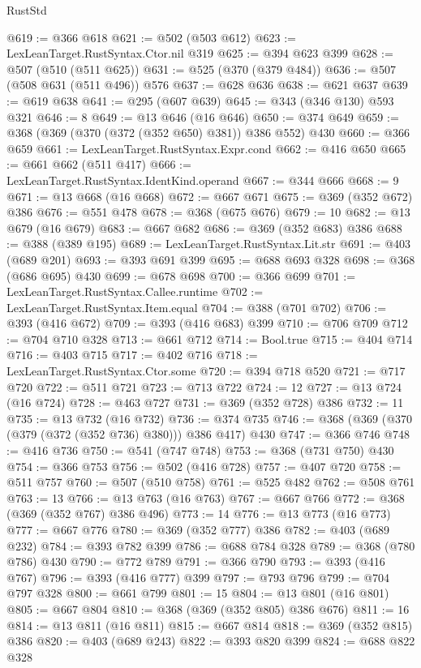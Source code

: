 \begin{lexlean}{RustStd}
\begin{coremodule}
@619 := @366 @618
@621 := @502 (@503 @612)
@623 := LexLeanTarget.RustSyntax.Ctor.nil @319
@625 := @394 @623 @399
@628 := @507 (@510 (@511 @625))
@631 := @525 (@370 (@379 @484))
@636 := @507 (@508 @631 (@511 @496)) @576
@637 := @628 @636
@638 := @621 @637
@639 := @619 @638
@641 := @295 (@607 @639)
@645 := @343 (@346 @130) @593 @321
@646 := 8
@649 := @13 @646 (@16 @646)
@650 := @374 @649
@659 := @368 (@369 (@370 (@372 (@352 @650) @381)) @386 @552) @430
@660 := @366 @659
@661 := LexLeanTarget.RustSyntax.Expr.cond
@662 := @416 @650
@665 := @661 @662 (@511 @417)
@666 := LexLeanTarget.RustSyntax.IdentKind.operand
@667 := @344 @666
@668 := 9
@671 := @13 @668 (@16 @668)
@672 := @667 @671
@675 := @369 (@352 @672) @386
@676 := @551 @478
@678 := @368 (@675 @676)
@679 := 10
@682 := @13 @679 (@16 @679)
@683 := @667 @682
@686 := @369 (@352 @683) @386
@688 := @388 (@389 @195)
@689 := LexLeanTarget.RustSyntax.Lit.str
@691 := @403 (@689 @201)
@693 := @393 @691 @399
@695 := @688 @693 @328
@698 := @368 (@686 @695) @430
@699 := @678 @698
@700 := @366 @699
@701 := LexLeanTarget.RustSyntax.Callee.runtime
@702 := LexLeanTarget.RustSyntax.Item.equal
@704 := @388 (@701 @702)
@706 := @393 (@416 @672)
@709 := @393 (@416 @683) @399
@710 := @706 @709
@712 := @704 @710 @328
@713 := @661 @712
@714 := Bool.true
@715 := @404 @714
@716 := @403 @715
@717 := @402 @716
@718 := LexLeanTarget.RustSyntax.Ctor.some
@720 := @394 @718 @520
@721 := @717 @720
@722 := @511 @721
@723 := @713 @722
@724 := 12
@727 := @13 @724 (@16 @724)
@728 := @463 @727
@731 := @369 (@352 @728) @386
@732 := 11
@735 := @13 @732 (@16 @732)
@736 := @374 @735
@746 := @368 (@369 (@370 (@379 (@372 (@352 @736) @380))) @386 @417) @430
@747 := @366 @746
@748 := @416 @736
@750 := @541 (@747 @748)
@753 := @368 (@731 @750) @430
@754 := @366 @753
@756 := @502 (@416 @728)
@757 := @407 @720
@758 := @511 @757
@760 := @507 (@510 @758)
@761 := @525 @482
@762 := @508 @761
@763 := 13
@766 := @13 @763 (@16 @763)
@767 := @667 @766
@772 := @368 (@369 (@352 @767) @386 @496)
@773 := 14
@776 := @13 @773 (@16 @773)
@777 := @667 @776
@780 := @369 (@352 @777) @386
@782 := @403 (@689 @232)
@784 := @393 @782 @399
@786 := @688 @784 @328
@789 := @368 (@780 @786) @430
@790 := @772 @789
@791 := @366 @790
@793 := @393 (@416 @767)
@796 := @393 (@416 @777) @399
@797 := @793 @796
@799 := @704 @797 @328
@800 := @661 @799
@801 := 15
@804 := @13 @801 (@16 @801)
@805 := @667 @804
@810 := @368 (@369 (@352 @805) @386 @676)
@811 := 16
@814 := @13 @811 (@16 @811)
@815 := @667 @814
@818 := @369 (@352 @815) @386
@820 := @403 (@689 @243)
@822 := @393 @820 @399
@824 := @688 @822 @328

\end{coremodule}
\end{lexlean}
